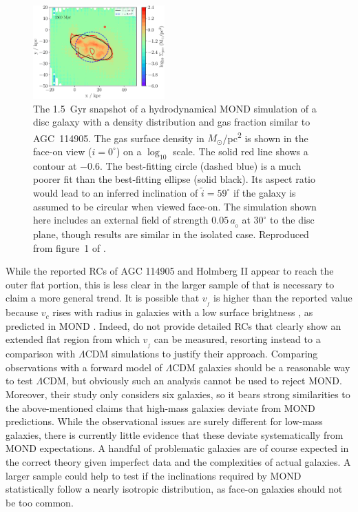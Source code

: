\documentclass[fleqn,usenatbib,useAMS,onecolumn]{mnras} %
\begin{document}
\begin{figure}
	\centering
	\includegraphics[width=0.45\textwidth]{AGC_114905_EFE_1-5Gyr-0_6}
	\caption{The 1.5~Gyr snapshot of a hydrodynamical MOND simulation of a disc galaxy with a density distribution and gas fraction similar to AGC~114905. The gas surface density in $M_\odot$/pc\textsuperscript{2} is shown in the face-on view ($i = 0^\circ$) on a $\log_{10}$ scale. The solid red line shows a contour at $-0.6$. The best-fitting circle (dashed blue) is a much poorer fit than the best-fitting ellipse (solid black). Its aspect ratio would lead to an inferred inclination of $\widetilde{i} = 59^\circ$ if the galaxy is assumed to be circular when viewed face-on. The simulation shown here includes an external field of strength $0.05 \, a_{_0}$ at $30^\circ$ to the disc plane, though results are similar in the isolated case. Reproduced from figure~1 of \citet{Banik_2022_fake_inclination}.}
	\label{Fake_inclination_figure}
\end{figure}

While the reported RCs of AGC 114905 and Holmberg II appear to reach the outer flat portion, this is less clear in the larger sample of \citet{Mancera_2020} that is necessary to claim a more general trend. It is possible that $v_{_f}$ is higher than the reported value because $v_c$ rises with radius in galaxies with a low surface brightness \citep[see e.g. figure~15 of][]{Famaey_McGaugh_2012}, as predicted in MOND \citep[figure~1 of][]{Milgrom_1983_galaxies}. Indeed, \citet{Mancera_2020} do not provide detailed RCs that clearly show an extended flat region from which $v_{_f}$ can be measured, resorting instead to a comparison with $\Lambda$CDM simulations to justify their approach. Comparing observations with a forward model of $\Lambda$CDM galaxies should be a reasonable way to test $\Lambda$CDM, but obviously such an analysis cannot be used to reject MOND. Moreover, their study only considers six galaxies, so it bears strong similarities to the above-mentioned claims that high-mass galaxies deviate from MOND predictions. While the observational issues are surely different for low-mass galaxies, there is currently little evidence that these deviate systematically from MOND expectations. A handful of problematic galaxies are of course expected in the correct theory given imperfect data and the complexities of actual galaxies. A larger sample could help to test if the inclinations required by MOND statistically follow a nearly isotropic distribution, as face-on galaxies should not be too common.
\end{document}
